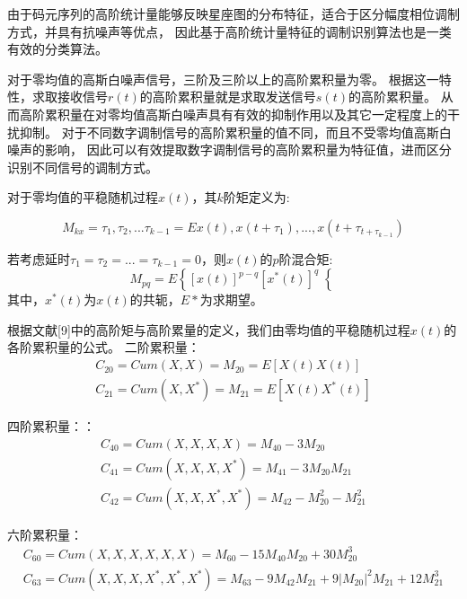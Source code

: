 由于码元序列的高阶统计量能够反映星座图的分布特征，适合于区分幅度相位调制方式，并具有抗噪声等优点，
因此基于高阶统计量特征的调制识别算法也是一类有效的分类算法。\par

对于零均值的高斯白噪声信号，三阶及三阶以上的高阶累积量为零。
根据这一特性，求取接收信号$r(t)$的高阶累积量就是求取发送信号$s(t)$的高阶累积量。
从而高阶累积量在对零均值高斯白噪声具有有效的抑制作用以及其它一定程度上的干扰抑制。
对于不同数字调制信号的高阶累积量的值不同，而且不受零均值高斯白噪声的影响，
因此可以有效提取数字调制信号的高阶累积量为特征值，进而区分识别不同信号的调制方式。\par

对于零均值的平稳随机过程$x(t)$，其$k$阶矩定义为:\par
\begin{equation}
\label{eqt_4_8}
M_{kx} = \tau_1, \tau_2, ... \tau_{k-1} = E{x(t), x(t+\tau_1), ..., x(t+\tau_{t+\tau_{k-1}})}
\end{equation}

若考虑延时$\tau_1 = \tau_2 = ... = \tau_{k-1} = 0$，则$x(t)$的$p$阶混合矩:
\begin{equation}
\label{eqt_4_9}
M_{pq} = E\left\lbrace \left[ x(t)\right]^{p-q} 
\left[ x^*(t)\right]^{q}\right\lbrace 
\end{equation}
其中，$x^*(t)$为$x(t)$的共轭，$E{*}$为求期望。\par
根据文献[9]中的高阶矩与高阶累量的定义，我们由零均值的平稳随机过程$x(t)$的各阶累积量的公式。
二阶累积量：
\begin{equation}
\label{eqt_4_10}
\begin{aligned}
C_{20} = Cum(X, X) = M_{20} = E[X(t)X(t)]\\
C_{21} = Cum(X, X^*) = M_{21} = E[X(t)X^*(t)]	
\end{aligned}
\end{equation}

四阶累积量：：
\begin{equation}
\label{eqt_4_11}
\begin{aligned}
C_{40}=Cum(X, X, X, X) = M_{40} - 3M_{20}\\
C_{41}=Cum(X, X, X, X^*) = M_{41} - 3M_{20}M_{21}\\
C_{42}=Cum(X, X, X^*, X^*) = M_{42} - M_{20}^2 - M_{21}^2
\end{aligned}
\end{equation}

六阶累积量：
\begin{equation}
\label{eqt_4_12}
\begin{aligned}
C_{60}=Cum(X, X, X, X, X, X) = M_{60} - 15M_{40}M_{20} + 30M_{20}^3\\
C_{63}=Cum(X, X, X, X^*, X^*, X^*) = M_{63} - 9M_{42}M_{21} 
+ 9\left|M_{20}\right|^2M_{21} + 12M_{21}^3
\end{aligned}
\end{equation}

